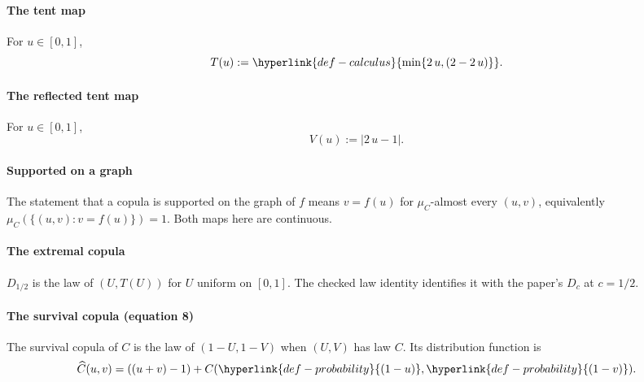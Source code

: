 \documentclass[11pt]{article}
\begin{document}
\hypertarget{def-tent}{}\paragraph{The tent map}
For $u\in[0,1]$,\[T(u):=\hyperlink{def-calculus}{\min\{2\,u,\left(2 - 2\,u\right)\}}.\]

\hypertarget{def-vee}{}\paragraph{The reflected tent map}
For $u\in[0,1]$,\[V(u):=\left|2\,u - 1\right|.\]

\hypertarget{def-graph}{}\paragraph{Supported on a graph}
The statement that a copula is supported on the graph of $f$ means $v=f(u)$ for $\mu_C$-almost every $(u,v)$, equivalently $\mu_C(\{(u,v):v=f(u)\})=1$. Both maps here are continuous.

\hypertarget{def-extremizer}{}\paragraph{The extremal copula}
$D_{1/2}$ is the law of $(U,T(U))$ for $U$ uniform on $[0,1]$. The checked law identity identifies it with the paper's $D_c$ at $c=1/2$.

\hypertarget{def-survival}{}\paragraph{The survival copula (equation 8)}
The survival copula of $C$ is the law of $(1-U,1-V)$ when $(U,V)$ has law $C$. Its distribution function is\[\widehat C(u,v)=\left(\left(u + v\right) - 1\right) + C(\hyperlink{def-probability}{(1-u)},\hyperlink{def-probability}{(1-v)}).\]
\end{document}
